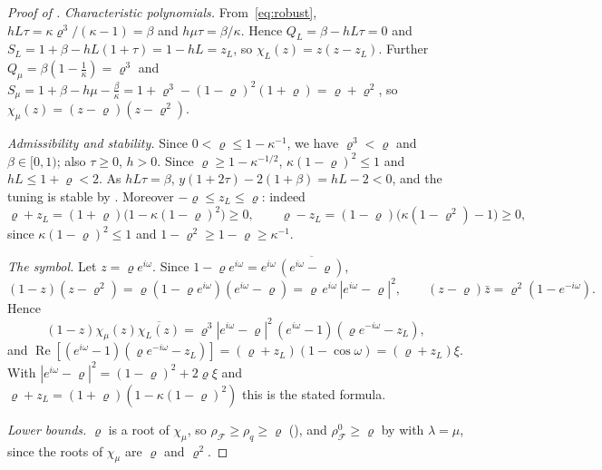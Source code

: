 \documentclass[11pt]{article}
\theoremstyle{definition}
\theoremstyle{remark}
\newcommand{\cF}{\mathcal F}
\newcommand{\Rea}{\operatorname{Re}}
\newcommand{\rhoF}{\rho_{\cF}}
\newcommand{\rhoz}{\rho_{\cF}^{0}}
\begin{document}
\begin{proof}[Proof of ]
\emph{Characteristic polynomials.}  From~\eqref{eq:robust}, \(hL\tau=\kappa\varrho^3/(\kappa-1)=\beta\) and
\(h\mu\tau=\beta/\kappa\).  Hence \(Q_L=\beta-hL\tau=0\) and \(S_L=1+\beta-hL(1+\tau)=1-hL=z_L\), so
\(\chi_L(z)=z(z-z_L)\).  Further \(Q_\mu=\beta(1-\frac1\kappa)=\varrho^3\) and
\(S_\mu=1+\beta-h\mu-\frac\beta\kappa=1+\varrho^3-(1-\varrho)^2(1+\varrho)=\varrho+\varrho^2\), so \(\chi_\mu(z)=(z-\varrho)(z-\varrho^2)\).

\emph{Admissibility and stability.}  Since \(0<\varrho\le1-\kappa^{-1}\), we have \(\varrho^3<\varrho\) and
\(\beta\in[0,1)\); also \(\tau\ge0\), \(h>0\).  Since \(\varrho\ge1-\kappa^{-1/2}\), \(\kappa(1-\varrho)^2\le1\) and
\(hL\le1+\varrho<2\).  As \(hL\tau=\beta\), \(y(1+2\tau)-2(1+\beta)=hL-2<0\), and the tuning is stable by
.  Moreover \(-\varrho\le z_L\le\varrho\): indeed
\[
\varrho+z_L=(1+\varrho)\bigl(1-\kappa(1-\varrho)^2\bigr)\ge0,\qquad
\varrho-z_L=(1-\varrho)\bigl(\kappa(1-\varrho^2)-1\bigr)\ge0,
\]
since \(\kappa(1-\varrho)^2\le1\) and \(1-\varrho^2\ge1-\varrho\ge\kappa^{-1}\).

\emph{The symbol.}  Let \(z=\varrho e^{i\omega}\).  Since \(1-\varrho e^{i\omega}=e^{i\omega}\,\overline{(e^{i\omega}-\varrho)}\),
\[
(1-z)(z-\varrho^2)=\varrho(1-\varrho e^{i\omega})(e^{i\omega}-\varrho)=\varrho\,e^{i\omega}\,|e^{i\omega}-\varrho|^2,
\qquad (z-\varrho)\bar z=\varrho^2(1-e^{-i\omega}).
\]
Hence
\[
(1-z)\chi_\mu(z)\overline{\chi_L(z)}=\varrho^3|e^{i\omega}-\varrho|^2\,(e^{i\omega}-1)(\varrho e^{-i\omega}-z_L),
\]
and \(\Rea[(e^{i\omega}-1)(\varrho e^{-i\omega}-z_L)]=(\varrho+z_L)(1-\cos\omega)=(\varrho+z_L)\xi\).  With
\(|e^{i\omega}-\varrho|^2=(1-\varrho)^2+2\varrho\xi\) and \(\varrho+z_L=(1+\varrho)(1-\kappa(1-\varrho)^2)\) this is the stated formula.

\emph{Lower bounds.}  \(\varrho\) is a root of \(\chi_\mu\), so \(\rhoF\ge\rho_q\ge\varrho\) (), and \(\rhoz\ge\varrho\) by
 with \(\lambda=\mu\), since the roots of \(\chi_\mu\) are \(\varrho\) and \(\varrho^2\).


\end{proof}
\end{document}
